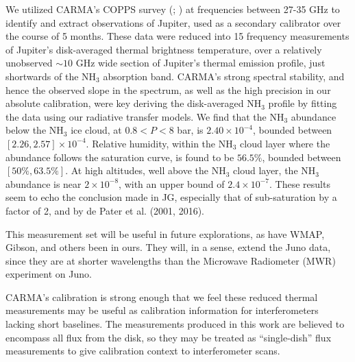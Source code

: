 \documentclass{article}
\newcommand{\e}[1]{\times 10^{#1}}
\begin{document}
	We utilized CARMA's COPPS survey (\citealt{2015ApJ...814..140K}; \citealt{2016ApJ...830...34K}) at frequencies between 27-35 GHz to identify and extract observations of Jupiter, used as a secondary calibrator over the course of 5 months. These data were reduced into 15 frequency measurements of Jupiter's disk-averaged thermal brightness temperature, over a relatively unobserved $\sim 10$ GHz wide section of Jupiter's thermal emission profile, just shortwards of the NH$_{3}$ absorption band.
	CARMA's strong spectral stability, and hence the observed slope in the spectrum, as well as the high precision in our absolute calibration, were key deriving the disk-averaged NH$_{3}$ profile by fitting the data using our radiative transfer models.
    We find that the NH$_{3}$ abundance below the NH$_{3}$ ice cloud, at $0.8 < P < 8$ bar,  is $2.40\e{-4}$, bounded between $[2.26, 2.57] \e{-4}$.
	Relative humidity, within the NH$_{3}$ cloud layer where the abundance follows the saturation curve, is found to be $56.5\%$, bounded between $[50\%, 63.5\%]$.
	At high altitudes, well above the NH$_{3}$ cloud layer, the NH$_{3}$  abundance is near $2\e{-8}$, with  an upper bound of $2.4\e{-7}$.
	These results seem to echo the conclusion made in JG, especially that of sub-saturation by a factor of 2, and by de Pater et al. (2001, 2016).

	This measurement set will be useful in future explorations, as have WMAP, Gibson, and others been in ours. They will, in a sense, extend the Juno data, since they are at shorter wavelengths than the Microwave Radiometer (MWR) experiment on Juno.
	

	CARMA's calibration is strong enough that we feel these reduced thermal measurements may be useful as calibration information for interferometers lacking short baselines.
	The measurements produced in this work are believed to encompass all flux from the disk, so they may be treated as ``single-dish'' flux measurements to give calibration context to interferometer scans.




\end{document}
